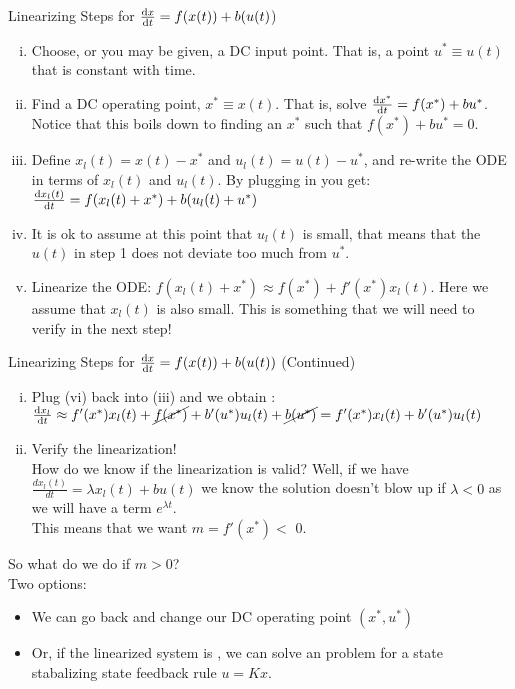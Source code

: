 \begin{frame}{Linearizing Steps for $\dv{x}{t} = f(x(t)) + b(u(t)$)}
\begin{enumerate}[(i)]
\item Choose, or you may be given, a DC input point. That is, a point $u^* \equiv u(t)$ that is constant with time.\pause \\
\item Find a DC operating point, $x^* \equiv x(t)$. That is, solve $\dv{x^*}{t} = f(x^*) + bu^*$. Notice that this boils down to finding an $x^*$ such that $f(x^*) + bu^* = 0 $. \pause \\
\item Define $x_l(t) = x(t) - x^*$ and $u_l(t) = u(t) - u^*$, and re-write the ODE in terms of $ x_l(t)$ and $ u_l(t)$. By plugging in you get: $\dv{x_l(t)}{t} = f(x_l(t) + x^*) + b(u_l(t)+ u^*)$ \pause \\
\item It is ok to assume at this point that $u_l(t)$ is small, that means that the $u(t)$ in step 1 does not deviate too much from $u^*$.\pause \\
\item Linearize the ODE: $f(x_l(t) + x^*) \approx f(x^*) + f'(x^*)x_l(t)$. Here we assume that $x_l(t)$ is also small. This is something that we will need to verify in the next step!
\end{enumerate}
\end{frame}
\begin{frame}{Linearizing Steps for $\dv{x}{t} = f(x(t)) + b(u(t))$ (Continued)}
\begin{enumerate}[(vi)]
  \item Plug (vi) back into  (iii) and we obtain : $\dv{x_l}{t} \approx f'(x^*)x_l(t) + \cancel{f(x^*)} + b'(u^*)u_l(t)+ \cancel{b(u^*)} = f'(x^*)x_l(t) + b'(u^*) u_l(t)$
\item Verify the linearization! \\
  How do we know if the linearization is valid? \pause Well, if we have $\frac{dx_l(t)}{dt} = \lambda x_l(t) + bu(t)$ we know the solution doesn't blow up if $\lambda < 0$ as we will have a term $e^{\lambda t}$.
\\ This means that we want $m = f'(x^*) <$  0. 
\end{enumerate} \pause
So what do we do if $m>0 $? \pause \\
Two options: \begin{itemize}
  \item We can go back and change our DC operating point $(x^*,u^*)$
  \item Or, if the linearized system is ,
    we can solve an  problem for
    a state stabalizing state feedback rule $u = K x$.
\end{itemize}
\end{frame}
